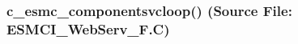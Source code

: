  
\setlength{\oldparskip}{\parskip}
\setlength{\parskip}{1.5ex}
\setlength{\oldparindent}{\parindent}
\setlength{\parindent}{0pt}
\setlength{\oldbaselineskip}{\baselineskip}
\setlength{\baselineskip}{11pt}
 
\def\bv{\begin{verbatim}}
\def\ev{\end{verbatim}}
\def\be{\begin{equation}}
\def\ee{\end{equation}}
\def\bea{\begin{eqnarray}}
\def\eea{\end{eqnarray}}
\def\bi{\begin{itemize}}
\def\ei{\end{itemize}}
\def\bn{\begin{enumerate}}
\def\en{\end{enumerate}}
\def\bd{\begin{description}}
\def\ed{\end{description}}
\def\({\left (}
\def\){\right )}
\def\[{\left [}
\def\]{\right ]}
\def\<{\left  \langle}
\def\>{\right \rangle}
\def\cI{{\cal I}}
\def\diag{\mathop{\rm diag}}
\def\tr{\mathop{\rm tr}}


 
\subsubsection{c\_esmc\_componentsvcloop() (Source File: ESMCI\_WebServ\_F.C)}


